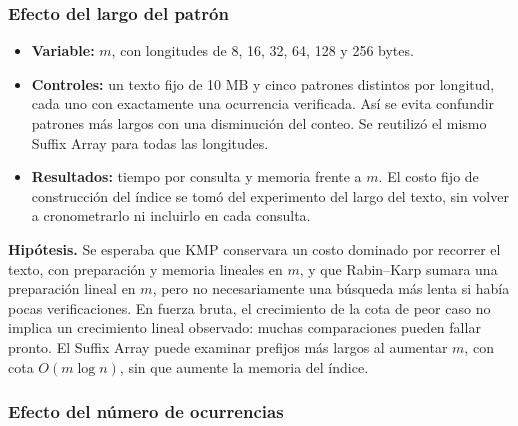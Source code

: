 \subsubsection{Efecto del largo del patrón}

\begin{itemize}
    \item \textbf{Variable:} \(m\), con longitudes de 8, 16, 32, 64, 128 y
    256 bytes.
    \item \textbf{Controles:} un texto fijo de 10 MB y cinco patrones distintos
    por longitud, cada uno con exactamente una ocurrencia verificada. Así se
    evita confundir patrones más largos con una disminución del conteo.
    Se reutilizó el mismo Suffix Array para todas las longitudes.
    \item \textbf{Resultados:} tiempo por consulta y memoria frente a \(m\).
    El costo fijo de construcción del índice se tomó del experimento del
    largo del texto, sin volver a cronometrarlo ni incluirlo en cada consulta.
\end{itemize}

\textbf{Hipótesis.} Se esperaba que KMP conservara un costo dominado por recorrer
el texto, con preparación y memoria lineales en \(m\), y que Rabin--Karp sumara
una preparación lineal en \(m\), pero no necesariamente una búsqueda más lenta
si había pocas verificaciones. En fuerza bruta, el crecimiento de la cota de peor caso no
implica un crecimiento lineal observado: muchas comparaciones pueden fallar
pronto. El Suffix Array puede examinar prefijos más largos al aumentar \(m\),
con cota \(O(m\log n)\), sin que aumente la memoria del índice.

\subsubsection{Efecto del número de ocurrencias}

